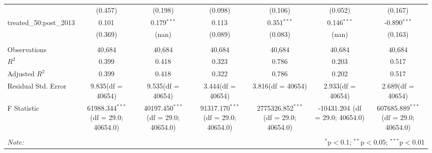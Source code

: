 \begin{table}[!htbp]
\begin{tabular}{@{\extracolsep{5pt}}lcccccc}
  & (0.457) & (0.198) & (0.098) & (0.106) & (0.052) & (0.167) \\
 treated_50:post_2013 & 0.101$^{}$ & 0.179$^{***}$ & 0.113$^{}$ & 0.351$^{***}$ & 0.146$^{***}$ & -0.890$^{***}$ \\
  & (0.369) & (nan) & (0.089) & (0.083) & (nan) & (0.163) \\
\hline \\[-1.8ex]
 Observations & 40,684 & 40,684 & 40,684 & 40,684 & 40,684 & 40,684 \\
 $R^2$ & 0.399 & 0.418 & 0.323 & 0.786 & 0.203 & 0.517 \\
 Adjusted $R^2$ & 0.399 & 0.418 & 0.322 & 0.786 & 0.202 & 0.517 \\
 Residual Std. Error & 9.835(df = 40654) & 9.535(df = 40654) & 3.444(df = 40654) & 3.816(df = 40654) & 2.933(df = 40654) & 2.689(df = 40654)  \\
 F Statistic & 61988.344$^{***}$ (df = 29.0; 40654.0) & 40197.450$^{***}$ (df = 29.0; 40654.0) & 91317.170$^{***}$ (df = 29.0; 40654.0) & 2775326.852$^{***}$ (df = 29.0; 40654.0) & -10431.204$^{}$ (df = 29.0; 40654.0) & 607685.889$^{***}$ (df = 29.0; 40654.0) \\
\hline
\hline \\[-1.8ex]
\textit{Note:} & \multicolumn{6}{r}{$^{*}$p$<$0.1; $^{**}$p$<$0.05; $^{***}$p$<$0.01} \\
\end{tabular}
\end{table}